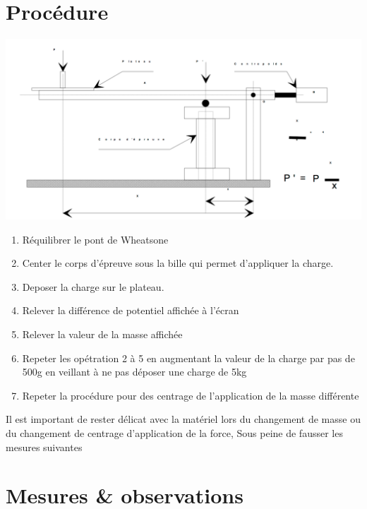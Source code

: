 \documentclass[11pt,a4paper]{report}
\begin{document}
\section*{Procédure}
\begin{center}
\includegraphics[scale=0.3]{Montage.jpg}
\end{center}
\begin{enumerate}
\item Réquilibrer le pont de Wheatsone
\item Center le corps d'épreuve sous la bille qui permet d'appliquer la charge.
\item Deposer la charge sur le plateau.
\item Relever la différence de potentiel affichée à l'écran
\item Relever la valeur de la masse affichée
\item Repeter les opétration 2 à 5 en augmentant la valeur de la charge par pas de 500g en veillant à ne pas déposer une charge de 5kg
\item Repeter la procédure pour des centrage de l'application de la masse différente
\end{enumerate} 


Il est important de rester délicat avec la matériel lors du changement de masse ou du changement de centrage d'application de la force, Sous peine de fausser les mesures suivantes
\newpage
\section*{Mesures \& observations}
\end{document}
